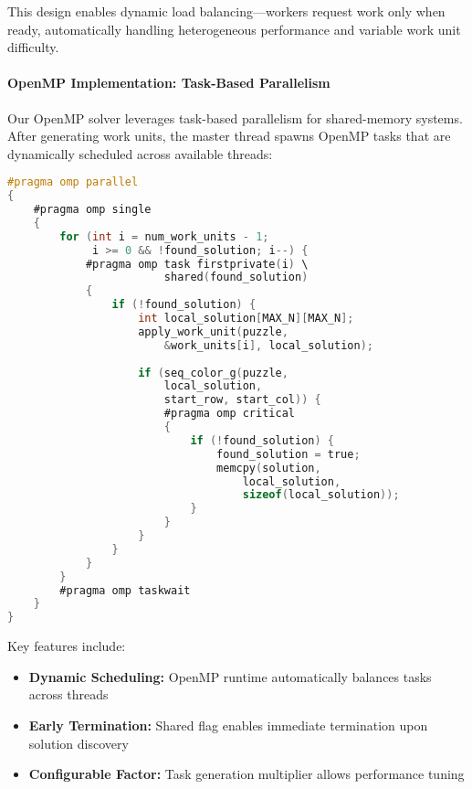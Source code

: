 This design enables dynamic load balancing—workers request work only when ready, automatically handling heterogeneous performance and variable work unit difficulty.


\paragraph{OpenMP Implementation: Task-Based Parallelism}
\label{par:omp_implementation}
Our OpenMP solver leverages task-based parallelism for shared-memory systems. After generating work units, the master thread spawns OpenMP tasks that are dynamically scheduled across available threads:

\begin{lstlisting}[language=C, caption=OpenMP task generation]
#pragma omp parallel
{
    #pragma omp single
    {
        for (int i = num_work_units - 1; 
             i >= 0 && !found_solution; i--) {
            #pragma omp task firstprivate(i) \
                        shared(found_solution)
            {
                if (!found_solution) {
                    int local_solution[MAX_N][MAX_N];
                    apply_work_unit(puzzle, 
                        &work_units[i], local_solution);
                    
                    if (seq_color_g(puzzle, 
                        local_solution, 
                        start_row, start_col)) {
                        #pragma omp critical
                        {
                            if (!found_solution) {
                                found_solution = true;
                                memcpy(solution, 
                                    local_solution, 
                                    sizeof(local_solution));
                            }
                        }
                    }
                }
            }
        }
        #pragma omp taskwait
    }
}
\end{lstlisting}

Key features include:
\begin{itemize}
    \item \textbf{Dynamic Scheduling:} OpenMP runtime automatically balances tasks across threads
    \item \textbf{Early Termination:} Shared flag enables immediate termination upon solution discovery
    \item \textbf{Configurable Factor:} Task generation multiplier allows performance tuning
\end{itemize}

